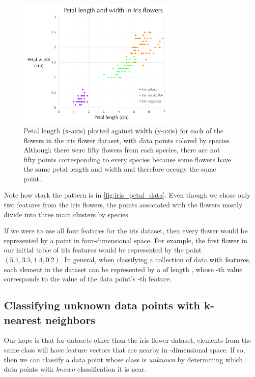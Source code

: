 \begin{figure}[h]
\centering
\mySfFamily
\includegraphics[width = 0.7\textwidth]{../images_CMYK/iris_petal_data}
\caption{Petal length (x-axis) plotted against width (y-axis) for each of the flowers in the iris flower dataset, with data points colored by species. Although there were fifty flowers from each species, there are not fifty points corresponding to every species because some flowers have the same petal length and width and therefore occupy the same point.}
\label{fig:iris_petal_data}
\end{figure}

Note how stark the pattern is in \autoref{fig:iris_petal_data}. Even though we chose only two features from the iris flowers, the points associated with the flowers mostly divide into three main clusters by species.

If we were to use all four features for the iris dataset, then every flower would be represented by a point in four-dimensional space. For example, the first flower in our initial table of iris features would be represented by the point $(5.1, 3.5, 1.4, 0.2)$. In general, when classifying a collection of data with  features, each element in the dataset can be represented by a  of length , whose -th value corresponds to the value of the data point's -th feature.

\FloatBarrier
{}
\subsection{Classifying unknown data points with k-nearest neighbors}

Our hope is that for datasets other than the iris flower dataset, elements from the same class will have feature vectors that are nearby in -dimensional space. If so, then we can classify a data point whose class is \textit{unknown} by determining which data points with \textit{known} classification it is near.\\

